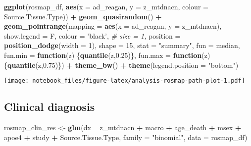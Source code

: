 \documentclass[]{book}
\newenvironment{Shaded}{\begin{snugshade}}{\end{snugshade}}
\newcommand{\CommentTok}[1]{\textcolor[rgb]{0.56,0.35,0.01}{\textit{#1}}}
\newcommand{\ControlFlowTok}[1]{\textcolor[rgb]{0.13,0.29,0.53}{\textbf{#1}}}
\newcommand{\DataTypeTok}[1]{\textcolor[rgb]{0.13,0.29,0.53}{#1}}
\newcommand{\DecValTok}[1]{\textcolor[rgb]{0.00,0.00,0.81}{#1}}
\newcommand{\FloatTok}[1]{\textcolor[rgb]{0.00,0.00,0.81}{#1}}
\newcommand{\KeywordTok}[1]{\textcolor[rgb]{0.13,0.29,0.53}{\textbf{#1}}}
\newcommand{\NormalTok}[1]{#1}
\newcommand{\OperatorTok}[1]{\textcolor[rgb]{0.81,0.36,0.00}{\textbf{#1}}}
\newcommand{\StringTok}[1]{\textcolor[rgb]{0.31,0.60,0.02}{#1}}
\begin{document}
\begin{Shaded}
\begin{Highlighting}[]
\KeywordTok{ggplot}\NormalTok{(rosmap_df, }\KeywordTok{aes}\NormalTok{(}\DataTypeTok{x =}\NormalTok{ ad_reagan, }\DataTypeTok{y =}\NormalTok{ z_mtdnacn, }\DataTypeTok{colour =}\NormalTok{ Source.Tissue.Type)) }\OperatorTok{+}\StringTok{ }
\StringTok{  }\KeywordTok{geom_quasirandom}\NormalTok{() }\OperatorTok{+}\StringTok{ }
\StringTok{  }\KeywordTok{geom_pointrange}\NormalTok{(}\DataTypeTok{mapping =} \KeywordTok{aes}\NormalTok{(}\DataTypeTok{x =}\NormalTok{ ad_reagan, }\DataTypeTok{y =}\NormalTok{ z_mtdnacn),}
                      \DataTypeTok{show.legend =}\NormalTok{ F, }\DataTypeTok{colour =} \StringTok{'black'}\NormalTok{,}
                     \CommentTok{# size = 1,}
                      \DataTypeTok{position =} \KeywordTok{position_dodge}\NormalTok{(}\DataTypeTok{width =} \DecValTok{1}\NormalTok{),}
                      \DataTypeTok{shape =} \DecValTok{15}\NormalTok{,}
                      \DataTypeTok{stat =} \StringTok{"summary"}\NormalTok{,}
                      \DataTypeTok{fun =}\NormalTok{ median,}
                      \DataTypeTok{fun.min =} \ControlFlowTok{function}\NormalTok{(z) \{}\KeywordTok{quantile}\NormalTok{(z,}\FloatTok{0.25}\NormalTok{)\},}
                      \DataTypeTok{fun.max =} \ControlFlowTok{function}\NormalTok{(z) \{}\KeywordTok{quantile}\NormalTok{(z,}\FloatTok{0.75}\NormalTok{)\}) }\OperatorTok{+}\StringTok{ }
\StringTok{  }\KeywordTok{theme_bw}\NormalTok{() }\OperatorTok{+}\StringTok{ }\KeywordTok{theme}\NormalTok{(}\DataTypeTok{legend.position =} \StringTok{"bottom"}\NormalTok{)}
\end{Highlighting}
\end{Shaded}

\texttt{[image: notebook\_files/figure-latex/analysis-rosmap-path-plot-1.pdf]}

\hypertarget{clinical-diagnosis-1}{%
\subsection{Clinical diagnosis}\label{clinical-diagnosis-1}}

\begin{Shaded}
\begin{Highlighting}[]
\NormalTok{rosmap_clin_res <-}\StringTok{ }\KeywordTok{glm}\NormalTok{(dx }\OperatorTok{~}\StringTok{ }\NormalTok{z_mtdnacn }\OperatorTok{+}\StringTok{ }\NormalTok{macro }\OperatorTok{+}\StringTok{ }\NormalTok{age_death }\OperatorTok{+}\StringTok{ }\NormalTok{msex }\OperatorTok{+}\StringTok{ }\NormalTok{apoe4 }\OperatorTok{+}\StringTok{ }\NormalTok{study }\OperatorTok{+}\StringTok{ }\NormalTok{Source.Tissue.Type, }\DataTypeTok{family =} \StringTok{"binomial"}\NormalTok{, }\DataTypeTok{data =}\NormalTok{ rosmap_df)}
\end{Highlighting}
\end{Shaded}
\end{document}
